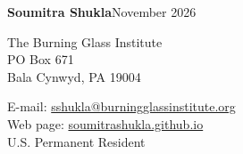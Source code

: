 \documentclass[11pt,letterpaper]{article}
\begin{document}
\fontsize{11}{13.5}\selectfont
{\normalsize\bfseries Soumitra Shukla}\hfill November 2026\par
\vspace{7pt}
\begin{minipage}[t]{0.48\textwidth}
The Burning Glass Institute\\
PO Box 671\\
Bala Cynwyd, PA 19004
\end{minipage}\hfill
\begin{minipage}[t]{0.50\textwidth}\raggedleft
E-mail: \href{mailto:sshukla@burningglassinstitute.org}{sshukla@burningglassinstitute.org}\\
Web page: \href{https://soumitrashukla.github.io}{soumitrashukla.github.io}\\
U.S. Permanent Resident
\end{minipage}
\vspace{16pt}
\end{document}

